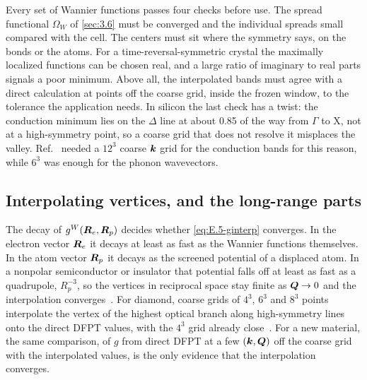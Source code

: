Every set of Wannier functions passes four checks before use. The spread functional $\Omega_W$ of \cref{sec:3.6} must be converged and the individual spreads small compared with the cell. The centers must sit where the symmetry says, on the bonds or the atoms. For a time-reversal-symmetric crystal the maximally localized functions can be chosen real, and a large ratio of imaginary to real parts signals a poor minimum. Above all, the interpolated bands must agree with a direct calculation at points off the coarse grid, inside the frozen window, to the tolerance the application needs. In silicon the last check has a twist: the conduction minimum lies on the $\Delta$ line at about 0.85 of the way from $\Gamma$ to X, not at a high-symmetry point, so a coarse grid that does not resolve it misplaces the valley. Ref.~\cite{ponce2018towards} needed a $12^3$ coarse $\bm{k}$ grid for the conduction bands for this reason, while $6^3$ was enough for the phonon wavevectors.

\subsection{Interpolating vertices, and the long-range parts}

The decay of $g^W(\bm{R}_e,\bm{R}_p)$ decides whether \cref{eq:E.5-ginterp} converges. In the electron vector $\bm{R}_e$ it decays at least as fast as the Wannier functions themselves. In the atom vector $\bm{R}_p$ it decays as the screened potential of a displaced atom. In a nonpolar semiconductor or insulator that potential falls off at least as fast as a quadrupole, $R_p^{-3}$, so the vertices in reciprocal space stay finite as $\bm{Q}\to0$ and the interpolation converges~\cite[Sect.~VI.A.2]{giustino2017electron}. For diamond, coarse grids of $4^3$, $6^3$ and $8^3$ points interpolate the vertex of the highest optical branch along high-symmetry lines onto the direct DFPT values, with the $4^3$ grid already close~\cite[Fig.~6]{giustino2017electron}. For a new material, the same comparison, of $g$ from direct DFPT at a few $(\bm{k},\bm{Q})$ off the coarse grid with the interpolated values, is the only evidence that the interpolation converges.

